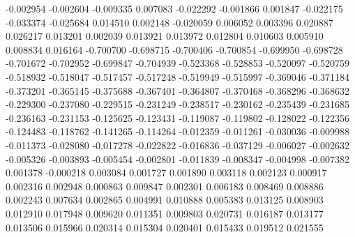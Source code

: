 -0.002954
-0.002604
-0.009335
0.007083
-0.022292
-0.001866
0.001847
-0.022175
-0.033374
-0.025684
0.014510
0.002148
-0.020059
0.006052
0.003396
0.020887
0.026217
0.013201
0.002039
0.013921
0.013972
0.012804
0.010603
0.005910
0.008834
0.016164
-0.700700
-0.698715
-0.700406
-0.700854
-0.699950
-0.698728
-0.701672
-0.702952
-0.699847
-0.704939
-0.523368
-0.528853
-0.520097
-0.520759
-0.518932
-0.518047
-0.517457
-0.517248
-0.519949
-0.515997
-0.369046
-0.371184
-0.373201
-0.365145
-0.375688
-0.367401
-0.364807
-0.370468
-0.368296
-0.368632
-0.229300
-0.237080
-0.229515
-0.231249
-0.238517
-0.230162
-0.235439
-0.231685
-0.236163
-0.231153
-0.125625
-0.123431
-0.119087
-0.119802
-0.128022
-0.122356
-0.124483
-0.118762
-0.141265
-0.114264
-0.012359
-0.011261
-0.030036
-0.009988
-0.011373
-0.028080
-0.017278
-0.022822
-0.016836
-0.037129
-0.006027
-0.002632
-0.005326
-0.003893
-0.005454
-0.002801
-0.011839
-0.008347
-0.004998
-0.007382
0.001378
-0.000218
0.003084
0.001727
0.001890
0.003118
0.002123
0.000917
0.002316
0.002948
0.000863
0.009847
0.002301
0.006183
0.008469
0.008886
0.002243
0.007634
0.002865
0.004991
0.010888
0.005383
0.013125
0.008903
0.012910
0.017948
0.009620
0.011351
0.009803
0.020731
0.016187
0.013177
0.013506
0.015966
0.020314
0.015304
0.020401
0.015433
0.019512
0.021555
